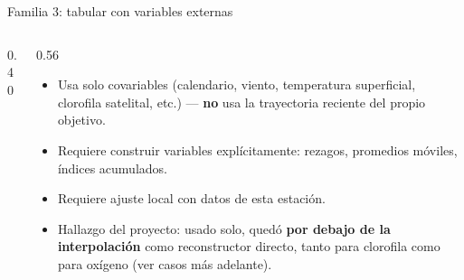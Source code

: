 \documentclass[aspectratio=169,11pt]{beamer}
\begin{document}
\begin{frame}[t]{Familia 3: tabular con variables externas}
  \vskip4pt
  \begin{columns}[T]
    \begin{column}{0.40\textwidth}
      \centering
    \end{column}
    \begin{column}{0.56\textwidth}
      \vskip0.3cm
      {\footnotesize
      \begin{itemize}\setlength\itemsep{0.18cm}
        \item Usa solo covariables (calendario, viento, temperatura superficial,
          clorofila satelital, etc.) --- \textbf{no} usa la trayectoria reciente del
          propio objetivo.
        \item Requiere construir variables explícitamente: rezagos, promedios móviles,
          índices acumulados.
        \item Requiere ajuste local con datos de esta estación.
        \item Hallazgo del proyecto: usado solo, quedó \textbf{por debajo de la
          interpolación} como reconstructor directo, tanto para clorofila como para
          oxígeno (ver casos más adelante).
      \end{itemize}}
    \end{column}
  \end{columns}
\end{frame}
\end{document}
